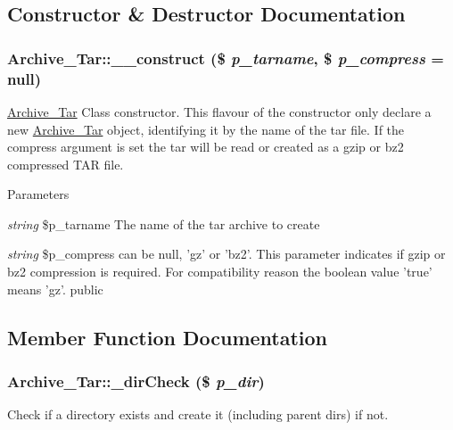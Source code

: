 \subsection{Constructor \& Destructor Documentation}
\hypertarget{classArchive__Tar_abf30f117a6be31f3abb8ce032f263756}{
\subsubsection[{\_\-\_\-construct}]{\setlength{\rightskip}{0pt plus 5cm}Archive\_\-Tar::\_\-\_\-construct (\$ {\em p\_\-tarname}, \/  \$ {\em p\_\-compress} = {\ttfamily null})}}
\label{classArchive__Tar_abf30f117a6be31f3abb8ce032f263756}
\hyperlink{classArchive__Tar}{Archive\_\-Tar} Class constructor. This flavour of the constructor only declare a new \hyperlink{classArchive__Tar}{Archive\_\-Tar} object, identifying it by the name of the tar file. If the compress argument is set the tar will be read or created as a gzip or bz2 compressed TAR file.


\begin{DoxyParams}{Parameters}
\item[{\em string}]\$p\_\-tarname The name of the tar archive to create \item[{\em string}]\$p\_\-compress can be null, 'gz' or 'bz2'. This parameter indicates if gzip or bz2 compression is required. For compatibility reason the boolean value 'true' means 'gz'.  public \end{DoxyParams}


\subsection{Member Function Documentation}
\hypertarget{classArchive__Tar_a71daeb735a74c5fd40bab55bed4b90c3}{
\subsubsection[{\_\-dirCheck}]{\setlength{\rightskip}{0pt plus 5cm}Archive\_\-Tar::\_\-dirCheck (\$ {\em p\_\-dir})}}
\label{classArchive__Tar_a71daeb735a74c5fd40bab55bed4b90c3}
Check if a directory exists and create it (including parent dirs) if not.


